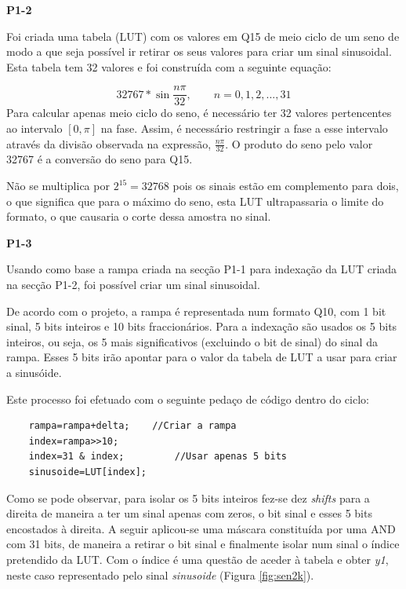 \documentclass[11pt]{article}
\begin{document}
\textbf{P1-2}

Foi criada uma tabela (LUT) com os valores em Q15 de meio ciclo de um seno de modo a que seja possível ir retirar os seus valores para criar um sinal sinusoidal. Esta tabela tem 32 valores e foi construída com a seguinte equação:

\begin{equation}
32767*\sin \dfrac{n \pi}{32},  \quad \quad n=0,1,2,...,31
\end{equation}
Para calcular apenas meio ciclo do seno, é necessário ter 32 valores pertencentes ao intervalo $[0,\pi]$ na fase. Assim, é necessário restringir a fase a esse intervalo através da divisão observada na expressão, $\frac{n \pi}{32}$. O produto do seno pelo valor 32767 é a conversão do seno para Q15. 

Não se multiplica por $2 ^{15}=32768$ pois os sinais estão em complemento para dois, o que significa que para o máximo do seno, esta LUT ultrapassaria o limite do formato, o que causaria o corte dessa amostra no sinal.
\vspace{2 mm}

\textbf{P1-3}

Usando como base a rampa criada na secção P1-1 para indexação da LUT criada na secção P1-2, foi possível criar um sinal  sinusoidal.

De acordo com o projeto, a rampa é representada num formato Q10, com 1 bit sinal, 5 bits inteiros e 10 bits fraccionários. 
Para a indexação são usados os 5 bits inteiros, ou seja, os 5 mais significativos (excluindo o bit de sinal) do sinal da rampa. Esses 5 bits irão apontar para o valor da tabela de LUT a usar para criar a sinusóide. 

Este processo foi efetuado com o seguinte pedaço de código dentro do ciclo:

\begin{lstlisting}
	rampa=rampa+delta;    //Criar a rampa
	index=rampa>>10;
	index=31 & index;         //Usar apenas 5 bits
	sinusoide=LUT[index];
\end{lstlisting}

Como se pode observar, para isolar os 5 bits inteiros fez-se dez \textit{shifts} para a direita de maneira a ter um sinal apenas com zeros, o bit sinal e esses 5 bits encostados à direita. A seguir aplicou-se uma máscara constituída por uma AND com 31 bits, de maneira a retirar o bit sinal e finalmente isolar num sinal o índice pretendido da LUT. Com o índice é uma questão de aceder à tabela e obter \textit{y1}, neste caso representado pelo sinal \textit{sinusoide} (Figura \ref{fig:sen2k}).
\end{document}
